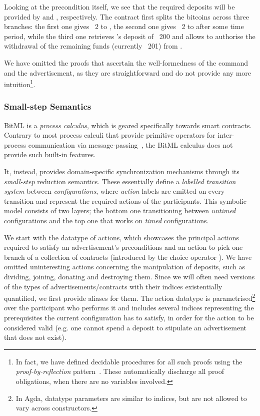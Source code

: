 \documentclass[acmsmall,nonacm=true,screen=true]{acmart}
\begin{document}
Looking at the precondition itself, we see that the required deposits will be provided by \inlineB{} and \inlineA{}, respectively.
The contract first splits the bitcoins across three branches:
the first one gives \bitcoin ~2 to \inlineB{}, the second one gives \bitcoin ~2 to \inlineA{} after some time period,
while the third one retrieves \inlineB{}'s deposit of \bitcoin ~200 and allows \inlineB{} to authorise the
withdrawal of the remaining funds (currently \bitcoin ~201) from \inlineA{}.

We have omitted the proofs that ascertain the well-formedness of the \inlinePut{} command and the advertisement, as
they are straightforward and do not provide any more intuition\footnote{
In fact, we have defined decidable procedures for all such proofs using the
\textit{proof-by-reflection} pattern~\cite{proofbyreflection}.
These automatically discharge all proof obligations, when there are no variables involved.}.

\subsubsection{Small-step Semantics}
BitML is a \textit{process calculus}, which is geared specifically towards smart contracts.
Contrary to most process calculi that provide primitive operators for inter-process communication via
message-passing~\cite{csp}, the BitML calculus does not provide such built-in features.

It, instead, provides domain-specific synchronization mechanisms through its \textit{small-step} reduction semantics.
These essentially define a \textit{labelled transition system} between \textit{configurations}, where
\textit{action} labels are emitted on every transition and represent the required actions of the participants.
This symbolic model consists of two layers; the bottom one transitioning between \textit{untimed} configurations and the top one
that works on \textit{timed} configurations.

We start with the datatype of actions, which showcases the principal actions required to satisfy an advertisement's preconditions
and an action to pick one branch of a collection of contracts (introduced by the choice operator \inlineOplus{}).
We have omitted uninteresting actions concerning the manipulation of deposits, such as dividing, joining, donating and destroying them.
Since we will often need versions of the types of advertisements/contracts with their
indices existentially quantified, we first provide aliases for them.
\BITactions{}
The action datatype is parametrised\footnote{
In Agda, datatype parameters are similar to indices, but are not allowed to vary across constructors.
}
over the participant who performs it
and includes several indices representing the prerequisites the current configuration has to satisfy, in order for
the action to be considered valid (e.g. one cannot spend a deposit to stipulate an advertisement that does not exist).
\end{document}

